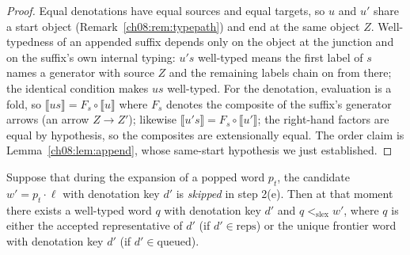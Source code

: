 \begin{proof}
Equal denotations have equal sources and equal targets, so $u$ and $u'$
share a start object (Remark~\ref{ch08:rem:typepath}) and end at the same
object $Z$. Well-typedness of an appended suffix depends only on the object
at the junction and on the suffix's own internal typing: $u's$ well-typed
means the first label of $s$ names a generator with source $Z$ and the
remaining labels chain on from there; the identical condition makes $us$
well-typed. For the denotation, evaluation is a fold, so
$\llbracket us\rrbracket = F_s\circ\llbracket u\rrbracket$ where $F_s$
denotes the composite of the suffix's generator arrows (an arrow
$Z\to Z'$); likewise
$\llbracket u's\rrbracket=F_s\circ\llbracket u'\rrbracket$; the right-hand
factors are equal by hypothesis, so the composites are extensionally equal.
The order claim is Lemma~\ref{ch08:lem:append}, whose same-start hypothesis
we just established.
\end{proof}

\begin{lemma}\label{ch08:lem:skip}
Suppose that during the expansion of a popped word $p_t$, the candidate
$w'=p_t\cdot\ell$ with denotation key $d'$ is \emph{skipped} in step 2(e).
Then at that moment there exists a well-typed word $q$ with denotation key
$d'$ and $q<_{\mathrm{slex}}w'$, where $q$ is either the accepted
representative of $d'$ (if $d'\in\text{reps}$) or the unique frontier word
with denotation key $d'$ (if $d'\in\text{queued}$).
\end{lemma}

